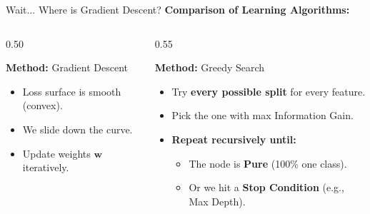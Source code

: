 \begin{frame}{Wait... Where is Gradient Descent?}
    \textbf{Comparison of Learning Algorithms:}

    \begin{columns}[T]
        \begin{column}{0.50\textwidth}
            \begin{tcolorbox}[colback=blue!5, title=\textbf{Non-Trees Models}]
                \textbf{Method:} Gradient Descent
                \begin{itemize}
                    \item Loss surface is smooth (convex).
                    \item We slide down the curve.
                    \item Update weights $\mathbf{w}$ iteratively.
                \end{itemize}
            \end{tcolorbox}
        \end{column}
        
        \begin{column}{0.55\textwidth}
            \begin{tcolorbox}[colback=green!5, title=\textbf{Decision Trees}]
                \textbf{Method:} Greedy Search
                \begin{itemize}
                    \item Try \textbf{every possible split} for every feature.
                    \item Pick the one with max Information Gain.
                    \item {\textbf{Repeat recursively until:}
            \begin{itemize}
                \item The node is \textbf{Pure} (100\% one class).
                \item Or we hit a \textbf{Stop Condition} (e.g., Max Depth).
            \end{itemize}}
                \end{itemize}
            \end{tcolorbox}
        \end{column}
    \end{columns}
    
\end{frame}

